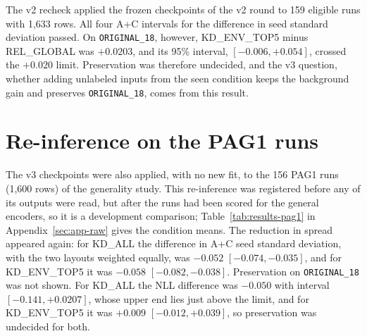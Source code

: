 The v2 recheck applied the frozen checkpoints of the
v2 round to 159 eligible runs with 1,633 rows. All four A+C intervals
for the difference in seed standard deviation passed. On
\texttt{ORIGINAL\_18}, however, KD\_ENV\_TOP5 minus REL\_GLOBAL was
$+0.0203$, and its 95\% interval, $[-0.006, +0.054]$, crossed the
$+0.020$ limit. Preservation was therefore undecided, and the v3 question, whether
adding unlabeled inputs from the seen condition keeps the background
gain and preserves \texttt{ORIGINAL\_18}, comes from this result.

\section{Re-inference on the PAG1 runs}
\label{sec:results-pag1}

The v3 checkpoints were also applied, with no new fit, to the 156 PAG1
runs (1,600 rows) of the generality study. This re-inference was
registered before any of its outputs were read, but after the runs had
been scored for the general encoders, so it is a development comparison;
Table~\ref{tab:results-pag1} in Appendix~\ref{sec:app-raw} gives the
condition means. The reduction in spread appeared again: for KD\_ALL the difference in A+C seed
standard deviation, with the two layouts weighted equally, was $-0.052$
$[-0.074, -0.035]$, and for KD\_ENV\_TOP5 it was $-0.058$
$[-0.082, -0.038]$. Preservation on \texttt{ORIGINAL\_18} was not
shown. For
KD\_ALL the NLL difference was $-0.050$ with interval
$[-0.141, +0.0207]$, whose upper end lies just above the limit, and for
KD\_ENV\_TOP5 it was $+0.009$ $[-0.012, +0.039]$, so preservation
was undecided for both.


